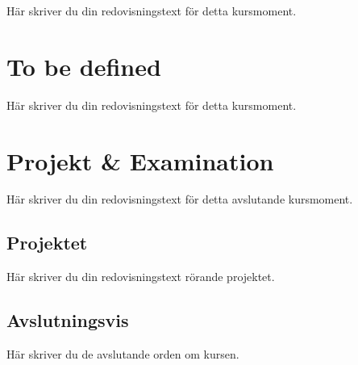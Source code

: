 \documentclass[oneside]{book}
\begin{document}
Här skriver du din redovisningstext för detta kursmoment.



\chapter{To be defined}

Här skriver du din redovisningstext för detta kursmoment.



\chapter{Projekt \& Examination}

Här skriver du din redovisningstext för detta avslutande kursmoment.

\section{Projektet}

Här skriver du din redovisningstext rörande projektet.

\section{Avslutningsvis}

Här skriver du de avslutande orden om kursen.



\newpage
\printbibliography
\end{document}
